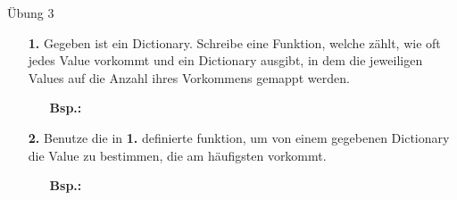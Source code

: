 \begin{frame}{Übung 3}
	\begin{itemize}
		\item[\textbf{1.}] Gegeben ist ein Dictionary. Schreibe eine Funktion, welche zählt, wie oft jedes Value vorkommt und ein Dictionary ausgibt, in dem die jeweiligen Values auf die Anzahl ihres Vorkommens gemappt werden.
		\begin{itemize}
			\item[\textbf{Bsp.:}]
		\end{itemize}
	
		\item[\textbf{2.}] Benutze die in \textbf{1.} definierte funktion, um von einem gegebenen Dictionary die Value zu bestimmen, die am häufigsten vorkommt.
		\begin{itemize}
			\item[\textbf{Bsp.:}]
		\end{itemize}
	\end{itemize}
\end{frame}



